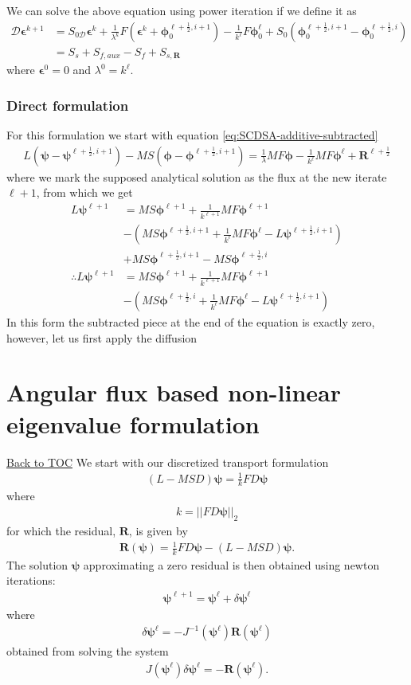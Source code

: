 \documentclass[11pt,letterpaper,notitlepage]{article}
\newcommand{\beqn}{\begin{equation}
		\begin{aligned}}
\newcommand{\eeqn}{\end{aligned}
\end{equation}}
\numberwithin{equation}{section}
\newcommand{\bphi}{\boldsymbol{\phi}}
\newcommand{\bpsi}{\boldsymbol{\psi}}
\newcommand{\bR}{\mathbf{R}}
\newcommand{\half}{\frac{1}{2}}
\newcommand{\bepsilon}{\boldsymbol{\epsilon}}
\newcommand{\BackToTOC}{\hyperlink{toc}{\scriptsize{\color{blue}Back to TOC}}\newline}
\begin{document}
We can solve the above equation using power iteration if we define it as
\beqn 
\mathcal{D} \bepsilon^{k+1} &= S_{0\mathcal{D}} \bepsilon^k + \frac{1}{\lambda^k}F(\bepsilon^k + \bphi_0^{\ell+\half,i+1}) - \frac{1}{k^\ell} F\bphi_0^\ell + S_0(\bphi_0^{\ell+\half,i+1} - \bphi_0^{\ell+\half,i}) \\
&= S_s + S_{f,aux} - S_f + S_{s,\mathbf{R}}
\eeqn 
where $\bepsilon^0 = 0$ and $\lambda^0 = k^\ell$.


\newpage 
\subsubsection{Direct formulation}
For this formulation we start with equation \eqref{eq:SCDSA-additive-subtracted}
\beqn 
L(\bpsi-\bpsi^{\ell+\half,i+1}) -MS(\bphi - \bphi^{\ell+\half,i+1})= \frac{1}{\lambda} MF\bphi - \frac{1}{k^\ell} MF\bphi^\ell + \mathbf{R}^{\ell + \half}
\eeqn
where we mark the supposed analytical solution as the flux at the new iterate $\ell+1$, from which we get
\beqn 
L\bpsi^{\ell+1} &= MS\bphi^{\ell+1} + \frac{1}{k^{\ell+1}}MF\bphi^{\ell+1} \\
&- (MS\bphi^{\ell+\half,i+1} + \frac{1}{k^\ell} MF\bphi^\ell - L\bpsi^{\ell+\half,i+1}) \\
&+ MS\bphi^{\ell+\half,i+1} - MS\bphi^{\ell+\half,i} 
\\
\therefore
L\bpsi^{\ell+1} 
&= MS\bphi^{\ell+1} + \frac{1}{k^{\ell+1}}MF\bphi^{\ell+1} \\
&-(MS\bphi^{\ell+\half,i} + \frac{1}{k^\ell} MF\bphi^\ell - L\bpsi^{\ell+\half,i+1}) \
\eeqn
In this form the subtracted piece at the end of the equation is exactly zero, however, let us first apply the diffusion


\newpage
{}
\section{Angular flux based non-linear eigenvalue formulation}
\BackToTOC
We start with our discretized transport formulation
\beqn 
(L - MSD)\bpsi = \frac{1}{k} FD\bpsi
\eeqn 
where
\beqn 
k = ||FD\bpsi ||_2
\eeqn 
for which the residual, $\bR$, is given by
\beqn 
\bR(\bpsi) = \frac{1}{k} FD\bpsi - (L - MSD)\bpsi.
\eeqn 
The solution $\bpsi$ approximating a zero residual is then obtained using newton iterations:
\beqn 
\bpsi^{\ell+1} = \bpsi^\ell + \delta \bpsi^\ell
\eeqn 
where
\beqn 
\delta \bpsi^\ell = -J^{-1}(\bpsi^\ell) \bR(\bpsi^\ell)
\eeqn 
obtained from solving the system
\beqn 
J(\bpsi^{\ell}) \delta \bpsi^{\ell} = -\bR(\bpsi^{\ell}).
\eeqn 
\end{document}
